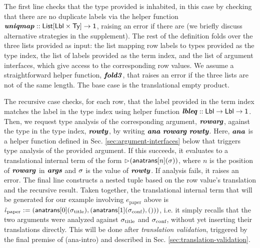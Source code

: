 The first line checks that the type provided is inhabited, in this case by checking that there are no duplicate labels via the helper function ${\textbf{\textit{uniqmap}}} :: {\sf List}[{\sf Lbl} \times {\sf Ty}]\rightarrow {\sf 1}$, raising an error if there are (we briefly discuss alternative strategies in the supplement).  %
The rest of the definition folds over the three lists provided as input: the list mapping row labels to types provided as the type index, the list of labels provided as the term index, and the list of argument interfaces, which give access to the corresponding row values. We assume a straightforward helper function, ${\textbf{\textit{fold3}}}$, that raises an error if the three lists are not of the same length. The base case is the translational empty product. 

The recursive case checks, for each row, that the label provided in the term index matches the label in the type index using helper function ${\textbf{\textit{lbleq}}} :: {\sf Lbl} \rightarrow {\sf Lbl} \rightarrow {\sf 1}$. Then, we request type analysis of the corresponding argument, ${\textbf{\textit{rowarg}}}$, against the type in the type index, ${\textbf{\textit{rowty}}}$, by writing ${\textbf{\textit{ana}}}~{\textbf{\textit{rowarg}}}~{\textbf{\textit{rowty}}}$. Here, ${\textbf{\textit{ana}}}$ is a helper function defined in Sec. \ref{sec:argument-interfaces} below that triggers type analysis of the provided argument. If this succeeds, it evaluates to a translational internal term  of the form ${\rhd}({\sf anatrans}[n](\sigma))$, where $n$ is the position of ${\textbf{\textit{rowarg}}}$ in ${\textbf{\textit{args}}}$ and $\sigma$ is the value of ${\textbf{\textit{rowty}}}$. If analysis fails, it raises an error. The final line constructs a nested tuple based on the row value's translation and the recursive result. Taken together, the translational internal term that will be generated for our example involving $e_\text{paper}$ above is $\small\hat{\iota}_\text{paper} := ({\sf anatrans}[0](\sigma_\text{title}), ({\sf anatrans}[1](\sigma_\text{conf}), ()))$, i.e. it simply recalls that the two arguments were analyzed against $\sigma_\text{title}$ and  $\sigma_\text{conf}$, without yet inserting their translations directly. 
This will be done after \emph{translation validation}, triggered by the final premise of (ana-intro) and described in Sec. \ref{sec:translation-validation}. %

